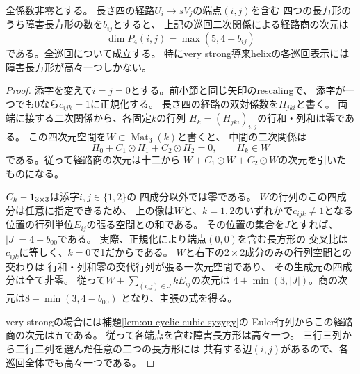 \begin{proposition}[四次経路空間の次元公式]
\label{prop:ou-dense-fourth-path}
全係数非零とする。
長さ四の経路$U_i\to sV_j$の端点$(i,j)$を含む
四つの長方形のうち障害長方形の数を$b_{ij}$とすると、
上記の巡回二次関係による経路商の次元は
\[
 \dim P_4(i,j)=\max(5,4+b_{ij})
\]
である。全巡回について成立する。
特にvery strong導来helixの各巡回表示には
障害長方形が高々一つしかない。
\end{proposition}
\begin{proof}
添字を変えて$i=j=0$とする。前小節と同じ矢印のrescalingで、
添字が一つでも$0$なら$c_{ijk}=1$に正規化する。
長さ四の経路の双対係数を$H_{jki}$と書く。
両端に接する二次関係から、各固定$k$の行列
$H_k=(H_{jki})_{i,j}$の行和・列和は零である。
この四次元空間を$W\subset\operatorname{Mat}_3(k)$と書くと、
中間の二次関係は
\[
 H_0+C_1\odot H_1+C_2\odot H_2=0,\qquad H_k\in W
\]
である。従って経路商の次元は十二から
$W+C_1\odot W+C_2\odot W$の次元を引いたものになる。

$C_k-{\bf 1}_{3\times3}$は添字$i,j\in\{1,2\}$の
四成分以外では零である。
$W$の行列のこの四成分は任意に指定できるため、
上の像は$W$と、$k=1,2$のいずれかで$c_{ijk}\ne1$となる
位置の行列単位$E_{ij}$の張る空間との和である。
その位置の集合を$J$とすれば、$|J|=4-b_{00}$である。
実際、正規化により端点$(0,0)$を含む長方形の
交叉比は$c_{ijk}$に等しく、$k=0$で1だからである。
$W$と右下の$2\times2$成分のみの行列空間との交わりは
行和・列和零の交代行列が張る一次元空間であり、
その生成元の四成分は全て非零。
従って$W+\sum_{(i,j)\in J}kE_{ij}$の次元は
$4+\min(3,|J|)$。商の次元は$8-\min(3,4-b_{00})$
となり、主張の式を得る。

very strongの場合には補題\ref{lem:ou-cyclic-cubic-syzygy}の
Euler行列からこの経路商の次元は五である。
従って各端点を含む障害長方形は高々一つ。
三行三列から二行二列を選んだ任意の二つの長方形には
共有する辺$(i,j)$があるので、各巡回全体でも高々一つである。
\end{proof}


